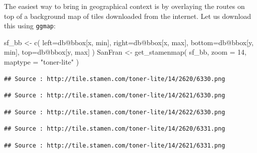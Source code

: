 \documentclass[
]{book}
\newenvironment{Shaded}{\begin{snugshade}}{\end{snugshade}}
\newcommand{\AttributeTok}[1]{\textcolor[rgb]{0.77,0.63,0.00}{#1}}
\newcommand{\DecValTok}[1]{\textcolor[rgb]{0.00,0.00,0.81}{#1}}
\newcommand{\FunctionTok}[1]{\textcolor[rgb]{0.00,0.00,0.00}{#1}}
\newcommand{\NormalTok}[1]{#1}
\newcommand{\OtherTok}[1]{\textcolor[rgb]{0.56,0.35,0.01}{#1}}
\newcommand{\SpecialCharTok}[1]{\textcolor[rgb]{0.00,0.00,0.00}{#1}}
\newcommand{\StringTok}[1]{\textcolor[rgb]{0.31,0.60,0.02}{#1}}
\begin{document}
The easiest way to bring in geographical context is by overlaying the routes on top of a background map of tiles downloaded from the internet. Let us download this using \texttt{ggmap}:

\begin{Shaded}
\begin{Highlighting}[]
\NormalTok{sf\_bb }\OtherTok{\textless{}{-}} \FunctionTok{c}\NormalTok{(}
  \AttributeTok{left=}\NormalTok{db}\SpecialCharTok{@}\NormalTok{bbox[}\StringTok{\textquotesingle{}x\textquotesingle{}}\NormalTok{, }\StringTok{\textquotesingle{}min\textquotesingle{}}\NormalTok{],}
  \AttributeTok{right=}\NormalTok{db}\SpecialCharTok{@}\NormalTok{bbox[}\StringTok{\textquotesingle{}x\textquotesingle{}}\NormalTok{, }\StringTok{\textquotesingle{}max\textquotesingle{}}\NormalTok{],}
  \AttributeTok{bottom=}\NormalTok{db}\SpecialCharTok{@}\NormalTok{bbox[}\StringTok{\textquotesingle{}y\textquotesingle{}}\NormalTok{, }\StringTok{\textquotesingle{}min\textquotesingle{}}\NormalTok{],}
  \AttributeTok{top=}\NormalTok{db}\SpecialCharTok{@}\NormalTok{bbox[}\StringTok{\textquotesingle{}y\textquotesingle{}}\NormalTok{, }\StringTok{\textquotesingle{}max\textquotesingle{}}\NormalTok{]}
\NormalTok{  )}
\NormalTok{SanFran }\OtherTok{\textless{}{-}} \FunctionTok{get\_stamenmap}\NormalTok{(}
\NormalTok{  sf\_bb, }
  \AttributeTok{zoom =} \DecValTok{14}\NormalTok{, }
  \AttributeTok{maptype =} \StringTok{"toner{-}lite"}
\NormalTok{  )}
\end{Highlighting}
\end{Shaded}

\begin{verbatim}
## Source : http://tile.stamen.com/toner-lite/14/2620/6330.png
\end{verbatim}

\begin{verbatim}
## Source : http://tile.stamen.com/toner-lite/14/2621/6330.png
\end{verbatim}

\begin{verbatim}
## Source : http://tile.stamen.com/toner-lite/14/2622/6330.png
\end{verbatim}

\begin{verbatim}
## Source : http://tile.stamen.com/toner-lite/14/2620/6331.png
\end{verbatim}

\begin{verbatim}
## Source : http://tile.stamen.com/toner-lite/14/2621/6331.png
\end{verbatim}
\end{document}
